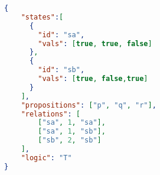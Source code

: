 \documentclass[border=10pt]{standalone}
\begin{document}
	
\begin{lstlisting}[language=json]
{
    "states":[
      {
        "id": "sa",
        "vals": [true, true, false]
      },
      {
        "id": "sb",
        "vals": [true, false,true]
      }
    ],
	"propositions": ["p", "q", "r"],
	"relations": [
        ["sa", 1, "sa"],
        ["sa", 1, "sb"],
        ["sb", 2, "sb"]
    ],
	"logic": "T"
}
	
\end{lstlisting}
\end{document}
